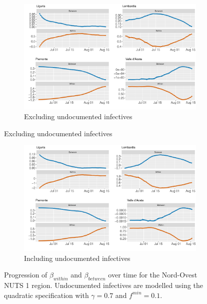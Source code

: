 \documentclass[12pt]{article}
\begin{document}
    \begin{figure}[H]
	    \centering
	    \begin{subfigure}{\textwidth}
	      \centering
	      \includegraphics[width=0.94\linewidth]{output/model_between_lag14_betas_Nord-Ovest_rolling.pdf}
	      \caption{Excluding undocumented infectives}
	      \label{fig:beta_between_over_time_nordovest_regular}
	    \end{subfigure}
    \end{figure}
    \begin{figure}[H]\ContinuedFloat
	    \begin{subfigure}{\textwidth}
	      \centering
	      \includegraphics[width=0.94\linewidth]{output/model_between_lag14_betas_Nord-Ovest_UndocQuadratic_rolling.pdf}
	      \caption{Including undocumented infectives}
	      \label{fig:beta_between_over_time_nordovest_regular_undoc}
	    \end{subfigure}
	    \caption{Progression of $\beta_{within}$ and $\beta_{between}$ over time for the Nord-Ovest NUTS 1 region. Undocumented infectives are modelled using the quadratic specification with $\gamma = 0.7$ and $f^{min}=0.1$.}
	    \label{fig:beta_between_over_time_nordovest}
    \end{figure}
	
\end{document}
